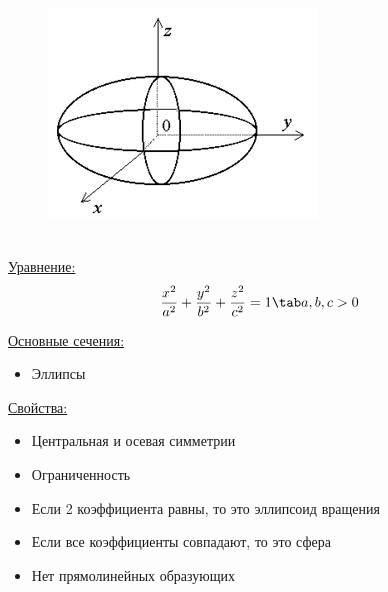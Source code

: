 \begin{figure}
    \includegraphics[width=1.0\linewidth]{images/эллипсоид.jpg}
\end{figure}

\tab\\

\underline{Уравнение:}
\[
\dfrac{x^2}{a^2} + \dfrac{y^2}{b^2} + \dfrac{z^2}{c^2} = 1 \tab a, b, c > 0
\]

\underline{Основные сечения:}
\begin{itemize}
    \item Эллипсы
\end{itemize}

\underline{Свойства:}
\begin{itemize}
    \item Центральная и осевая симметрии
    \item Ограниченность
    \item Если 2 коэффициента равны, то это эллипсоид вращения
    \item Если все коэффициенты совпадают, то это сфера
    \item Нет прямолинейных образующих
\end{itemize}


